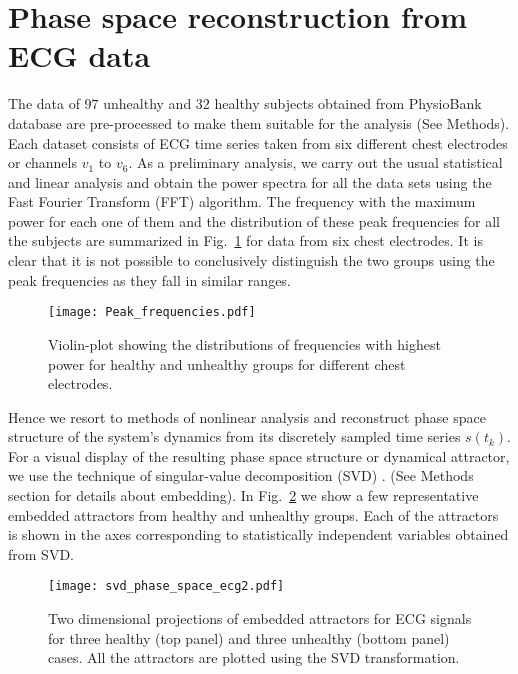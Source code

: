 \documentclass[9pt,twocolumn,twoside]{pnas-new}
\begin{document}
\section{Phase space reconstruction from ECG data}
The data of $97$ unhealthy and $32$ healthy subjects obtained from PhysioBank database \cite{goldberger2000physiobank} are pre-processed to make them suitable for the analysis (See Methods). Each dataset consists of ECG time series taken from six different chest electrodes or channels $v_1$ to $v_6$. As a preliminary analysis, we carry out the usual statistical and linear analysis and obtain the power spectra for all the data sets using the Fast Fourier Transform (FFT) algorithm. The frequency with the maximum power for each one of them and the distribution of these peak frequencies for all the subjects are summarized in Fig.~\ref{peak_freq} for data from six chest electrodes. It is clear that it is not possible to conclusively distinguish the two groups using the peak frequencies as they fall in similar ranges. 

\begin{figure}[h]
\begin{center}
\texttt{[image: Peak\_frequencies.pdf]}
\caption{\label{peak_freq} Violin-plot showing the distributions of frequencies with highest power for healthy and unhealthy groups for different chest electrodes. }
\end{center}
\end{figure}

Hence we resort to methods of nonlinear analysis and reconstruct phase space structure of the system's dynamics from its discretely sampled time series $s(t_k)$. For a visual display of the resulting phase space structure or dynamical attractor, we use the technique of singular-value decomposition (SVD) \cite{broomhead1986extracting, albano1988singular}. (See Methods section for details about embedding). In Fig.~\ref{phase_space} we show a few representative embedded attractors from healthy and unhealthy groups. Each of the attractors is shown in the axes corresponding to statistically independent variables obtained from SVD. 

\begin{figure}[h]
\begin{center}
\texttt{[image: svd\_phase\_space\_ecg2.pdf]}
\caption{\label{phase_space} Two dimensional projections of embedded attractors for ECG signals for three healthy (top panel) and three unhealthy (bottom panel) cases. All the attractors are plotted using the SVD transformation.}
\end{center}
\end{figure}
\end{document}
